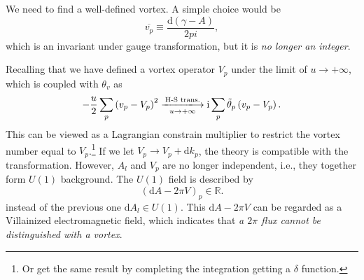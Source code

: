 We need to find a well-defined vortex. A simple choice would be
\begin{equation}
  \overline{v_p} \equiv \frac{\mathrm{d} \left( \gamma - A \right)}{2 pi},
\end{equation}
which is an invariant under gauge transformation,  but it is \emph{no longer an integer}.

Recalling that we have defined a vortex operator $V_p$ under the limit of $u \to+ \infty $, which is coupled with $\theta_{v}$ as 
\begin{equation}
  - \frac{u}{2} \sum_{p} \left( v_p - V_p \right)^{2} \xlongrightarrow[u \to +\infty]{\text{H-S trans.}} \mathrm{i} \sum_{p} \tilde{\theta}_{p} \left( v_p - V_p \right).
\end{equation}
This can be viewed as a Lagrangian constrain multiplier to restrict the vortex number equal to $V_p$.\footnote{Or get the same result by completing the integration getting a $\delta$ function.}
If we let $V_p \to V_p + \mathrm{d} k_p$, the theory is compatible with the transformation. However, $A_l$ and $V_p$ are no longer independent, i.e., they together form $U(1)$ background. The $U(1)$ field is described by
\begin{equation}
  \left( \mathrm{d} A - 2\pi V \right)_{p} \in \mathbb{R}.
\end{equation}
instead of the previous one $\mathrm{d} A_l \in U\left(1\right)$. This $\mathrm{d} A - 2\pi V$ can be regarded as a Villainized electromagnetic field, which indicates that \emph{a $2\pi $ flux cannot be distinguished with a vortex}.

